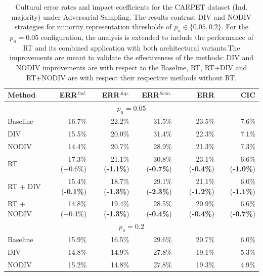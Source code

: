 %
\begin{table}
\centering
\small
\begin{tabular}{lrrrrr}
\toprule
\textbf{Method} & \textbf{ERR$^{Ind.}$} & \textbf{ERR$^{Jap.}$} & \textbf{ERR$^{Scan.}$} & \textbf{ERR} & \textbf{CIC} \\
\midrule
\multicolumn{6}{c}{$p_u=0.05$} \\
\midrule
Baseline & 16.7\%&	22.2\%&	31.5\%&	23.5\%&	7.6\%\\	
DIV & 15.5\%&	20.0\%&	31.4\%&	22.3\%&	7.1\%\\	
NODIV & 14.4\%&	20.7\%&	28.9\%&	21.3\%&	7.3\%\\
\midrule
RT              & 17.3\% (+0.6\%) & 21.1\% (\textbf{-1.1\%}) & 30.8\% (\textbf{-0.7\%}) & 23.1\% (\textbf{-0.4\%}) & 6.6\% (\textbf{-1.0\%}) \\
RT + DIV        & 15.4\% (\textbf{-0.1\%}) & 18.7\% (\textbf{-1.3\%}) & 29.1\% (\textbf{-2.3\%}) & 21.1\% (\textbf{-1.2\%}) & 6.0\% (\textbf{-1.1\%}) \\
RT + NODIV      & 14.8\% (+0.4\%) & 19.4\% (\textbf{-1.3\%}) & 28.5\% (\textbf{-0.4\%}) & 20.9\% (\textbf{-0.4\%}) & 6.6\% (\textbf{-0.7\%}) \\
\midrule
\multicolumn{6}{c}{$p_u=0.2$} \\
\midrule
Baseline & 15.9\% & 16.5\% & 29.6\% & 20.7\% & 6.0\% \\
DIV & 14.8\% & 14.9\% & 27.8\% & 19.1\% & 5.3\% \\
NODIV & 15.2\% & 14.8\% & 27.8\% & 19.3\% & 4.9\% \\
\bottomrule
\end{tabular}
\caption{Cultural error rates and impact coefficients for the CARPET dataset (Ind. majority) under Adversarial Sampling. The results contrast DIV and NODIV strategies for minority representation thresholds of $p_u \in \{0.05, 0.2\}$. For the $p_u = 0.05$ configuration, the analysis is extended to include the performance of RT and its combined application with both architectural variants.The improvements are meant to validate the effectiveness of the methods: DIV and NODIV improvements are with respect to the Baseline, RT, RT+DIV and RT+NODIV are with respect their respective methods without RT.}
\label{ch3:tab:ADVCI}
\end{table}
%
%
